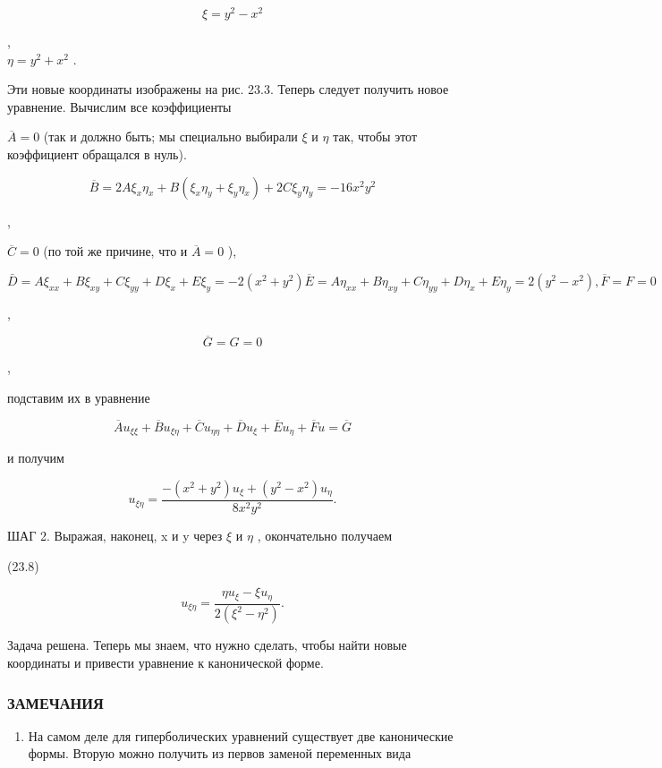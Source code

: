 \documentclass[
  ukrainian,
]{article}
\providecommand{\tightlist}{%
  \setlength{\itemsep}{0pt}\setlength{\parskip}{0pt}}
\begin{document}
\[
\xi = y^2 - x^2
\]

,\\
\(\eta = y^2 + x^2\) .

Эти новые координаты изображены на рис. 23.3. Теперь следует получить
новое уравнение. Вычислим все коэффициенты

\(\overline{A} = 0\) (так и должно быть; мы специально выбирали \(\xi\)
и \(\eta\) так, чтобы этот коэффициент обращался в нуль).

\[
\overline{B} = 2A\xi_x\eta_x + B(\xi_x\eta_y + \xi_y\eta_x) + 2C\xi_y\eta_y = -16x^2y^2
\]

,

\(\overline{C} = 0\) (по той же причине, что и \(\overline{A} = 0\) ),

\[
\bar{D} = A\xi_{xx} + B\xi_{xy} + C\xi_{yy} + D\xi_x + E\xi_y = -2(x^2 + y^2)
\overline{E} = A\eta_{xx} + B\eta_{xy} + C\eta_{yy} + D\eta_x + E\eta_y = 2(y^2 - x^2),
\overline{F} = F = 0
\]

,

\[
\overline{G} = G = 0
\]

,

подставим их в уравнение

\[
\overline{A}u_{\xi\xi} + \overline{B}u_{\xi\eta} + \overline{C}u_{\eta\eta} + \overline{D}u_{\xi} + \overline{E}u_{\eta} + \overline{F}u = \overline{G}
\]

и получим

\[
u_{\xi\eta} = \frac{-(x^2 + y^2) u_{\xi} + (y^2 - x^2) u_{\eta}}{8x^2y^2}.
\]

ШАГ 2. Выражая, наконец, x и y через \(\xi\) и \(\eta\) , окончательно
получаем

(23.8)

\[
u_{\xi\eta} = \frac{\eta u_{\xi} - \xi u_{\eta}}{2(\xi^2 - \eta^2)}.
\]

Задача решена. Теперь мы знаем, что нужно сделать, чтобы найти новые
координаты и привести уравнение к канонической форме.

\subsubsection{ЗАМЕЧАНИЯ}\label{ux437ux430ux43cux435ux447ux430ux43dux438ux44f-4}

\begin{enumerate}
\def\labelenumi{\arabic{enumi}.}
\tightlist
\item
  На самом деле для гиперболических уравнений существует две
  канонические формы. Вторую можно получить из первов заменой переменных
  вида
\end{enumerate}
\end{document}
